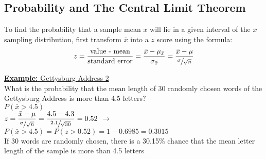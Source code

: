 \documentclass[a4paper]{article}
\let\bf\textbf
\begin{document}
\subsection{Probability and The Central Limit Theorem}
To find the probability that a sample mean $\bar{x}$ will lie in a given interval of the $\bar{x}$ sampling distribution, first transform $\bar{x}$ into a $z$ score using the formula:
\begin{align}
    z = \frac{\text{value - mean}}{\text{standard error}} = \frac{\bar{x} - \mu_{\bar{x}}}{\sigma_{\bar{x}}} = \frac{\bar{x} - \mu}{\sfrac{\sigma}{\sqrt{n}}}
\end{align}
\begin{shaded}
    \underline{\bf{Example:} Gettysburg Address 2}
    \vspace{2mm}\\
    What is the probability that the mean length of 30 randomly chosen words of the Gettysburg Address is more than 4.5 letters?
    \vspace{1mm}\\
    $P(\bar{x} > 4.5)$\\
    $\displaystyle z = \frac{\bar{x} - \mu}{\sfrac{\sigma}{\sqrt{n}}} = \frac{4.5 - 4.3}{\sfrac{2.1}{\sqrt{30}}} = 0.52$ \hspace{2mm}$\to$\hspace{2mm} $P(\bar{x} > 4.5) = P(z > 0.52) = 1-0.6985 = 0.3015$\\
    If 30 words are randomly chosen, there is a 30.15\% chance that the mean letter length of the sample is more than 4.5 letters
\end{shaded}
\newpage
\end{document}
